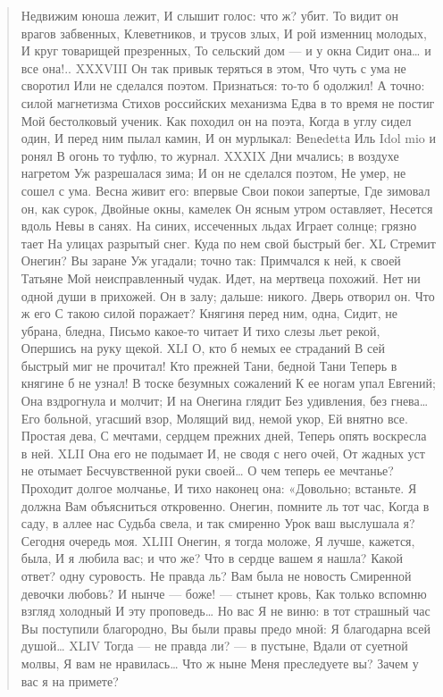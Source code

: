 \begin{verse}
Недвижим юноша лежит,
И слышит голос: что ж? убит.
То видит он врагов забвенных,
Клеветников, и трусов злых,
И рой изменниц молодых,
И круг товарищей презренных,
То сельский дом — и у окна
Сидит она… и все она!..
XXXVIII
Он так привык теряться в этом,
Что чуть с ума не своротил
Или не сделался поэтом.
Признаться: то-то б одолжил!
А точно: силой магнетизма
Стихов российских механизма
Едва в то время не постиг
Мой бестолковый ученик.
Как походил он на поэта,
Когда в углу сидел один,
И перед ним пылал камин,
И он мурлыкал: Веnеdеttа
Иль Idol mio и ронял
В огонь то туфлю, то журнал.
XXXIX
Дни мчались; в воздухе нагретом
Уж разрешалася зима;
И он не сделался поэтом,
Не умер, не сошел с ума.
Весна живит его: впервые
Свои покои запертые,
Где зимовал он, как сурок,
Двойные окны, камелек
Он ясным утром оставляет,
Несется вдоль Невы в санях.
На синих, иссеченных льдах
Играет солнце; грязно тает
На улицах разрытый снег.
Куда по нем свой быстрый бег.
ХL
Стремит Онегин? Вы заране
Уж угадали; точно так:
Примчался к ней, к своей Татьяне
Мой неисправленный чудак.
Идет, на мертвеца похожий.
Нет ни одной души в прихожей.
Он в залу; дальше: никого.
Дверь отворил он. Что ж его
С такою силой поражает?
Княгиня перед ним, одна,
Сидит, не убрана, бледна,
Письмо какое-то читает
И тихо слезы льет рекой,
Опершись на руку щекой.
ХLI
О, кто б немых ее страданий
В сей быстрый миг не прочитал!
Кто прежней Тани, бедной Тани
Теперь в княгине б не узнал!
В тоске безумных сожалений
К ее ногам упал Евгений;
Она вздрогнула и молчит;
И на Онегина глядит
Без удивления, без гнева…
Его больной, угасший взор,
Молящий вид, немой укор,
Ей внятно все. Простая дева,
С мечтами, сердцем прежних дней,
Теперь опять воскресла в ней.
XLII
Она его не подымает
И, не сводя с него очей,
От жадных уст не отымает
Бесчувственной руки своей…
О чем теперь ее мечтанье?
Проходит долгое молчанье,
И тихо наконец она:
«Довольно; встаньте. Я должна
Вам объясниться откровенно.
Онегин, помните ль тот час,
Когда в саду, в аллее нас
Судьба свела, и так смиренно
Урок ваш выслушала я?
Сегодня очередь моя.
XLIII
Онегин, я тогда моложе,
Я лучше, кажется, была,
И я любила вас; и что же?
Что в сердце вашем я нашла?
Какой ответ? одну суровость.
Не правда ль? Вам была не новость
Смиренной девочки любовь?
И нынче — боже! — стынет кровь,
Как только вспомню взгляд холодный
И эту проповедь… Но вас
Я не виню: в тот страшный час
Вы поступили благородно,
Вы были правы предо мной:
Я благодарна всей душой…
XLIV
Тогда — не правда ли? — в пустыне,
Вдали от суетной молвы,
Я вам не нравилась… Что ж ныне
Меня преследуете вы?
Зачем у вас я на примете?

\end{verse}
